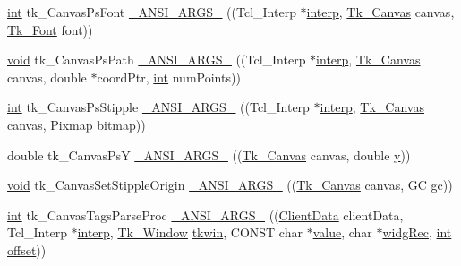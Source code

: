 \begin{DoxyCompactItemize}
\item 
\hyperlink{tk_8h_a83f82f76e7fed06f4c49d2db94028a6d}{int} tk\+\_\+\+Canvas\+Ps\+Font \hyperlink{struct_tk_stubs_a6c94559667129847a0b2c214e91f4d8c}{\+\_\+\+A\+N\+S\+I\+\_\+\+A\+R\+G\+S\+\_\+} ((Tcl\+\_\+\+Interp $\ast$\hyperlink{tk_8h_a5ab79c0f5849ee8e6a2e955a6c536cc0}{interp}, \hyperlink{tk_8h_a48928ad64693bd6179f628ad883f3250}{Tk\+\_\+\+Canvas} canvas, \hyperlink{tk_8h_a9fc14938fbad69507d71d60fe79e26f6}{Tk\+\_\+\+Font} font))
\item 
\hyperlink{tk_8h_aba408b7cd755a96426e004c015f5de8e}{void} tk\+\_\+\+Canvas\+Ps\+Path \hyperlink{struct_tk_stubs_a65bbe8992fba96eecb8e8d9306207abf}{\+\_\+\+A\+N\+S\+I\+\_\+\+A\+R\+G\+S\+\_\+} ((Tcl\+\_\+\+Interp $\ast$\hyperlink{tk_8h_a5ab79c0f5849ee8e6a2e955a6c536cc0}{interp}, \hyperlink{tk_8h_a48928ad64693bd6179f628ad883f3250}{Tk\+\_\+\+Canvas} canvas, double $\ast$coord\+Ptr, \hyperlink{tk_8h_a83f82f76e7fed06f4c49d2db94028a6d}{int} num\+Points))
\item 
\hyperlink{tk_8h_a83f82f76e7fed06f4c49d2db94028a6d}{int} tk\+\_\+\+Canvas\+Ps\+Stipple \hyperlink{struct_tk_stubs_a60159bb7d81bd3a3a16425d29f1d430f}{\+\_\+\+A\+N\+S\+I\+\_\+\+A\+R\+G\+S\+\_\+} ((Tcl\+\_\+\+Interp $\ast$\hyperlink{tk_8h_a5ab79c0f5849ee8e6a2e955a6c536cc0}{interp}, \hyperlink{tk_8h_a48928ad64693bd6179f628ad883f3250}{Tk\+\_\+\+Canvas} canvas, Pixmap bitmap))
\item 
double tk\+\_\+\+Canvas\+PsY \hyperlink{struct_tk_stubs_ae5ff9157c29cb5269dd8de9e16d274a3}{\+\_\+\+A\+N\+S\+I\+\_\+\+A\+R\+G\+S\+\_\+} ((\hyperlink{tk_8h_a48928ad64693bd6179f628ad883f3250}{Tk\+\_\+\+Canvas} canvas, double \hyperlink{tk_8h_a40f4f3601c0eaa8ca46b1a164264696d}{y}))
\item 
\hyperlink{tk_8h_aba408b7cd755a96426e004c015f5de8e}{void} tk\+\_\+\+Canvas\+Set\+Stipple\+Origin \hyperlink{struct_tk_stubs_a6a6ec4d7600b4b3719101f0641964b65}{\+\_\+\+A\+N\+S\+I\+\_\+\+A\+R\+G\+S\+\_\+} ((\hyperlink{tk_8h_a48928ad64693bd6179f628ad883f3250}{Tk\+\_\+\+Canvas} canvas, GC gc))
\item 
\hyperlink{tk_8h_a83f82f76e7fed06f4c49d2db94028a6d}{int} tk\+\_\+\+Canvas\+Tags\+Parse\+Proc \hyperlink{struct_tk_stubs_a3a457022ad263a91fe1f676dd394b867}{\+\_\+\+A\+N\+S\+I\+\_\+\+A\+R\+G\+S\+\_\+} ((\hyperlink{tk_8h_accf84b4d725a8f41e04d6333768a6001}{Client\+Data} client\+Data, Tcl\+\_\+\+Interp $\ast$\hyperlink{tk_8h_a5ab79c0f5849ee8e6a2e955a6c536cc0}{interp}, \hyperlink{tk_8h_ab756137de3ee74edc2501bd0d761e37c}{Tk\+\_\+\+Window} \hyperlink{tk_8h_a35df722e7e1b6efd651683b8be7c1490}{tkwin}, C\+O\+N\+ST char $\ast$\hyperlink{tk_8h_a177a0765f574ef6642002696d9cd82d0}{value}, char $\ast$\hyperlink{tk_8h_afd6092a0b5521b8d68bf11fab880cf9d}{widg\+Rec}, \hyperlink{tk_8h_a83f82f76e7fed06f4c49d2db94028a6d}{int} \hyperlink{tk_8h_a639d138baf6d6446a1490e5202738702}{offset}))

\end{DoxyCompactItemize}
